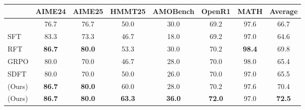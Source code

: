 \def\changesize#1{\fontsize{#1}{10.5pt}\selectfont}
\begin{table}[h]
\centering
\small
\fontsize{9pt}{10.5pt}\selectfont
    \renewcommand{\arraystretch}{1.2}
    \setlength{\tabcolsep}{2.6pt}
\begin{tabular}{lccccccc}
\toprule
\cmidrule(lr){2-7}
 & {AIME24} & {AIME25} & {HMMT25} & {AMOBench} & {OpenR1} & {MATH} & \textbf{Average}\\
\midrule
\textbf{\qwen{}}           & 76.7          & 76.7          & 50.0          & 30.0          & 69.2          & 97.6          & 66.7          \\
SFT                        & 83.3          & 73.3          & 46.7          & 18.0          & 69.2          & 97.0          & 64.6          \\
RFT                        & \textbf{86.7} & \textbf{80.0} & 53.3          & 30.0          & 70.2          & \textbf{98.4} & 69.8          \\
GRPO                       & 80.0          & 70.0          & 46.7          & 28.0          & 70.0          & 98.0          & 65.4          \\
SDFT                       & 80.0          & 70.0          & 50.0          & 26.0          & 70.0          & 97.0          & 65.5          \\
\textbf{\sft{}} (Ours)     & \textbf{86.7} & \textbf{80.0} & 60.0          & 28.0          & 70.2          & 97.6          & 70.4          \\
\textbf{\ours{}} (Ours)    & \textbf{86.7} & \textbf{80.0} & \textbf{63.3} & \textbf{36.0} & \textbf{72.0} & 97.0          & \textbf{72.5} \\
\midrule


\end{tabular}
\end{table}
